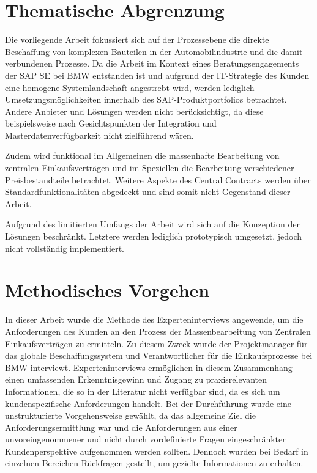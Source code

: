 
\section{Thematische Abgrenzung}

Die vorliegende Arbeit fokussiert sich auf der Prozessebene die direkte Beschaffung von komplexen Bauteilen in der Automobilindustrie und die damit verbundenen Prozesse. Da die Arbeit im Kontext eines Beratungsengagements der SAP SE bei BMW entstanden ist und aufgrund der IT-Strategie des Kunden eine homogene Systemlandschaft angestrebt wird, werden lediglich Umsetzungsmöglichkeiten innerhalb des SAP-Produktportfolios betrachtet. Andere Anbieter und Lösungen werden nicht berücksichtigt, da diese beispielsweise nach Gesichtspunkten der Integration und Masterdatenverfügbarkeit nicht zielführend wären. 

Zudem wird funktional im Allgemeinen die massenhafte Bearbeitung von zentralen Einkaufsverträgen und im Speziellen die Bearbeitung verschiedener Preisbestandteile betrachtet. Weitere Aspekte des Central Contracts werden über Standardfunktionalitäten abgedeckt und sind somit nicht Gegenstand dieser Arbeit.

Aufgrund des limitierten Umfangs der Arbeit wird sich auf die Konzeption der Lösungen beschränkt. Letztere werden lediglich prototypisch umgesetzt, jedoch nicht vollständig implementiert.


\section{Methodisches Vorgehen}

In dieser Arbeit wurde die Methode des Experteninterviews angewende, um die Anforderungen des Kunden an den Prozess der Massenbearbeitung von Zentralen Einkaufsverträgen zu ermitteln. Zu diesem Zweck wurde der Projektmanager für das globale Beschaffungssystem und Verantwortlicher für die Einkaufsprozesse bei BMW interviewt. Experteninterviews ermöglichen in diesem Zusammenhang einen umfassenden Erkenntnisgewinn und Zugang zu praxisrelevanten Informationen, die so in der Literatur nicht verfügbar sind, da es sich um kundenspezifische Anforderungen handelt. Bei der Durchführung wurde eine unstrukturierte Vorgehensweise gewählt, da das allgemeine Ziel die Anforderungsermittlung war und die Anforderungen aus einer unvoreingenommener und nicht durch vordefinierte Fragen eingeschränkter Kundenperspektive aufgenommen werden sollten. Dennoch wurden bei Bedarf in einzelnen Bereichen Rückfragen gestellt, um gezielte Informationen zu erhalten.

